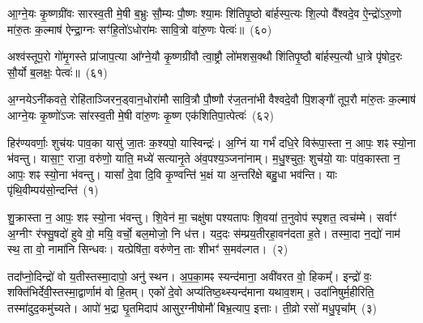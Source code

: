 {\anuvakamend[{अ॒ल॒जः सु॑प॒र्णो᳚\-ऽष्टाद॑शाष्टा॒द॑श}]}%

आ॒ग्ने॒यः कृ॒ष्णग्री॑वः सारस्व॒ती मे॒षी ब॒भ्रुः सौ॒म्यः पौ॒ष्णः श्या॒मः शि॑तिपृ॒ष्ठो बा॑र्\mbox{}हस्प॒त्यः शि॒ल्पो वै᳚श्वदे॒व ऐ॒न्द्रो॑\-ऽरु॒णो मा॑रु॒तः क॒ल्माष॑ ऐन्द्रा॒ग्नः सꣳ॑हि॒तो॑\-ऽधोरा॑मः सावि॒त्रो वा॑रु॒णः पेत्वः॑॥~(६०)

{\anuvakamend[{आ॒ग्ने॒यो द्वाविꣳ॑शतिः}]}%

अश्व॑स्तूप॒रो गो॑मृ॒गस्ते प्रा॑जाप॒त्या आ᳚ग्ने॒यौ कृ॒ष्णग्री॑वौ त्वा॒ष्ट्रौ लो॑मशस॒क्थौ शि॑तिपृ॒ष्ठौ बा॑र्\mbox{}हस्प॒त्यौ धा॒त्रे पृ॑षोद॒रः सौ॒र्यो ब॒लक्षः॒ पेत्वः॑॥~(६१)

{\anuvakamend[{अश्वः॒ षोड॑श}]}%

अ॒ग्नये\-ऽनी॑कवते॒ रोहि॑ताञ्जिरन॒ड्वान॒धोरा॑मौ सावि॒त्रौ पौ॒ष्णौ र॑ज॒तना॑भी वैश्वदे॒वौ पि॒शङ्गौ॑ तूप॒रौ मा॑रु॒तः क॒ल्माष॑ आग्ने॒यः कृ॒ष्णो॑\-ऽजः सा॑रस्व॒ती मे॒षी वा॑रु॒णः कृ॒ष्ण एक॑शितिपा॒त्पेत्वः॑~(६२)


{\anuvakamend[{अ॒ग्नयो\-ऽनी॑कवते॒ द्वाविꣳ॑शतिः}]}%

{}%

\setcounter{anuvakam}{0}
हिर॑ण्यवर्णाः॒ शुच॑यः पाव॒का यासु॑ जा॒तः क॒श्यपो॒ यास्विन्द्रः॑। अ॒ग्निं या गर्भं॑ दधि॒रे विरू॑पा॒स्ता न॒ आपः॒ शꣴ स्यो॒ना भ॑वन्तु। यासा॒ꣳ॒ राजा॒ वरु॑णो॒ याति॒ मध्ये॑ सत्यानृ॒ते अ॑व॒पश्य॒ञ्जना॑नाम्। म॒धु॒श्चुतः॒ शुच॑यो॒ याः पा॑व॒कास्ता न॒ आपः॒ शꣴ स्यो॒ना भ॑वन्तु। यासां᳚ दे॒वा दि॒वि कृ॒ण्वन्ति॑ भ॒क्षं या अ॒न्तरि॑क्षे बहु॒धा भव॑न्ति। याः पृ॑थि॒वीम्पय॑सो॒न्दन्ति॑~(१)

शु॒क्रास्ता न॒ आपः॒ शꣴ स्यो॒ना भ॑वन्तु। शि॒वेन॑ मा॒ चक्षु॑षा पश्यतापः शि॒वया॑ त॒नुवोप॑ स्पृशत॒ त्वच॑म्मे। सर्वाꣳ॑ अ॒ग्नीꣳ र॑फ्सु॒षदो॑ हुवे वो॒ मयि॒ वर्चो॒ बल॒मोजो॒ नि ध॑त्त। यद॒दः स॑म्प्रय॒तीरहा॒वन॑दता ह॒ते। तस्मा॒दा न॒द्यो॑ नाम॑ स्थ॒ ता वो॒ नामा॑नि सिन्धवः। यत्प्रेषि॑ता॒ वरु॑णेन॒ ताः शीभꣳ॑ स॒मव॑ल्गत।~(२)

तदा᳚प्नो॒दिन्द्रो॑ वो य॒तीस्तस्मा॒दापो॒ अनु॑ स्थन। अ॒प॒का॒मꣴ स्यन्द॑माना॒ अवी॑वरत वो॒ हिकम्᳚। इन्द्रो॑ वः॒ शक्ति॑भिर्देवी॒स्तस्मा॒द्वार्णाम॑ वो हि॒तम्। एको॑ दे॒वो अप्य॑तिष्ठ॒थ्स्यन्द॑माना यथाव॒शम्। उदा॑निषुर्म॒हीरिति॒ तस्मा॑दुद॒कमु॑च्यते। आपो॑ भ॒द्रा घृ॒तमिदाप॑ आसुर॒ग्नीषोमौ॑ बिभ्र॒त्याप॒ इत्ताः। ती॒व्रो रसो॑ मधु॒पृचा᳚म्~(३)

